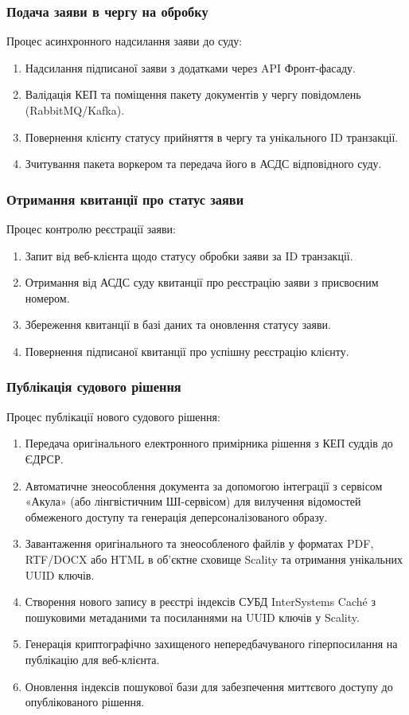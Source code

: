 \documentclass{article}
\begin{document}
\subsubsection{Подача заяви в чергу на обробку}
Процес асинхронного надсилання заяви до суду:
\begin{enumerate}
    \item Надсилання підписаної заяви з додатками через API Фронт-фасаду.
    \item Валідація КЕП та поміщення пакету документів у чергу повідомлень (RabbitMQ/Kafka).
    \item Повернення клієнту статусу прийняття в чергу та унікального ID транзакції.
    \item Зчитування пакета воркером та передача його в АСДС відповідного суду.
\end{enumerate}

\subsubsection{Отримання квитанції про статус заяви}
Процес контролю реєстрації заяви:
\begin{enumerate}
    \item Запит від веб-клієнта щодо статусу обробки заяви за ID транзакції.
    \item Отримання від АСДС суду квитанції про реєстрацію заяви з присвоєним номером.
    \item Збереження квитанції в базі даних та оновлення статусу заяви.
    \item Повернення підписаної квитанції про успішну реєстрацію клієнту.
\end{enumerate}
\subsubsection{Публікація судового рішення}
Процес публікації нового судового рішення:
\begin{enumerate}
    \item Передача оригінального електронного примірника рішення з КЕП суддів до ЄДРСР.
    \item Автоматичне знеособлення документа за допомогою інтеграції з сервісом «Акула» (або лінгвістичним ШІ-сервісом) для вилучення відомостей обмеженого доступу та генерація деперсоналізованого образу.
    \item Завантаження оригінального та знеособленого файлів у форматах PDF, RTF/DOCX або HTML в об'єктне сховище Scality та отримання унікальних UUID ключів.
    \item Створення нового запису в реєстрі індексів СУБД InterSystems Caché з пошуковими метаданими та посиланнями на UUID ключів у Scality.
    \item Генерація криптографічно захищеного непередбачуваного гіперпосилання на публікацію для веб-клієнта.
    \item Оновлення індексів пошукової бази для забезпечення миттєвого доступу до опублікованого рішення.
\end{enumerate}
\end{document}
